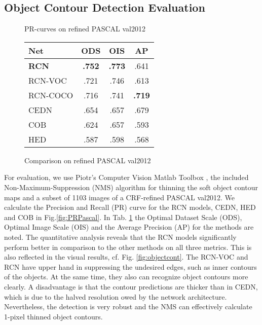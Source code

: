 \documentclass[runningheads]{llncs}
\begin{document}
\subsection{Object Contour Detection Evaluation}
\begin{figure}[t]\CenterFloatBoxes
\begin{floatrow}
  {   \caption{PR-curves on refined PASCAL val2012}\label{fig:PRPascal}}
\killfloatstyle
\ttabbox
  {\begin{tabular}{|l|c|c|c|}
\hline
Net & ODS & OIS & AP \\
\hline\hline
          \textbf{RCN} & \textbf{.752} & \textbf{.773} & .641\\
          RCN-VOC & .721 & .746 & .613 \\
          RCN-COCO & .716 & .741 & \textbf{.719}\\
          CEDN & .654 & .657 & .679\\
          COB & .624 & .657 & .593\\
          HED & .587 & .598 & .568\\
\hline
\end{tabular}
  }
  {\caption{Comparison on refined PASCAL val2012}\label{tab:Pascaltab}}
\end{floatrow}
\end{figure}
For evaluation, we use Piotr's Computer Vision Matlab Toolbox \cite{Dollar}, the included Non-Maximum-Suppression (NMS) algorithm for thinning the soft object contour maps and a subset of 1103 images of a CRF-refined PASCAL val2012. We calculate the Precision and Recall (PR) curve for the RCN models, CEDN, HED and COB in Fig.\ref{fig:PRPascal}. In Tab. \ref{tab:Pascaltab} the Optimal Dataset Scale (ODS), Optimal Image Scale (OIS) and the Average Precision (AP) for the methods are noted. The quantitative analysis reveals that the RCN models significantly perform better in comparison to the other methods on all three metrics. This is also reflected in the visual results, cf. Fig. \ref{fig:objectcont}. The RCN-VOC and RCN have upper hand in suppressing the undesired edges, such as inner contours of the objects. At the same time, they also can recognize object contours more clearly. A disadvantage is that the contour predictions are thicker than in CEDN, which is due to the halved resolution owed by the network architecture. Nevertheless, the detection is very robust and the NMS can effectively calculate 1-pixel thinned object contours.
\end{document}
